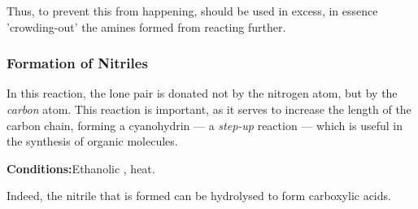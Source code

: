 
				Thus, to prevent this from happening,  should be used in excess, in essence 'crowding-out' the amines formed
				from reacting further.




			\pagebreak
			\subsubsection{Formation of Nitriles}

				In this reaction, the lone pair is donated not by the nitrogen atom, but by the \textit{carbon} atom. This reaction is
				important, as it serves to increase the length of the carbon chain, forming a cyanohydrin --- a \textit{step-up}
				reaction --- which is useful in the synthesis of organic molecules.

				\vspace{1.5em}
				\vbox{\textbf{Conditions:}\tabto{35mm}Ethanolic , heat.}




				\hypertarget{NitrileUses}{}
				Indeed, the nitrile that is formed can be hydrolysed to form carboxylic acids.

